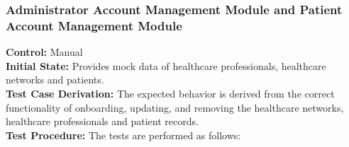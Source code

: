 \documentclass[12pt, titlepage]{article}
\begin{document}
\subsubsection{Administrator Account Management Module and Patient Account Management Module}

  \textbf{Control:} Manual\\
  \textbf{Initial State:} Provides mock data of healthcare professionals, healthcare networks and patients.\\
  \textbf{Test Case Derivation:} The expected behavior is derived from the correct functionality of onboarding, updating, and removing the healthcare networks, healthcare professionals and patient records.\\
  \textbf{Test Procedure:} The tests are performed as follows:\\
\end{document}
